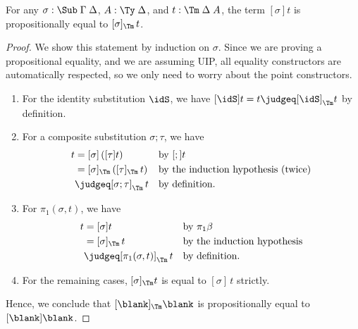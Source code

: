 \documentclass[a4paper,UKenglish,numberwithinsect,cleveref,thm-restate]{lipics-v2021}
\begin{document}
\begin{proposition}\label{prop:correctness-1}
  For any $\sigma : \Sub\;\Gamma\;\Delta$, $A : \Ty\;\Delta$, and $t : \Tm\;\Delta\;A$, the term $[\sigma]t$ is propositionally equal to $[\sigma]_{\Tm}\,t$.
\end{proposition}
\begin{proof}
  We show this statement by induction on $\sigma$. Since we are proving a propositional equality, and we are assuming UIP, all equality constructors are automatically respected, so we only need to worry about the point constructors.
  \begin{enumerate}
    \item For the identity substitution $\idS$, we have $[\idS]t = t \judgeq [\idS]_{\Tm} t$ by definition.
    \item For a composite substitution $\sigma; \tau$, we have
      \begin{align*}
        [\sigma;\tau]t & = [\sigma]\,([\tau] t)            && \text{by $[;]t$} \\
                       & = [\sigma]_{\Tm}\,([\tau]_{\Tm}\,t) && \text{by the induction hypothesis (twice)} \\ %
                       & \judgeq [\sigma;\tau]_{\Tm}\,t && \text{by definition.}
      \end{align*}
    \item For $\pi_1(\sigma, t)$, we have
      \begin{align*}
        [\pi_1(\sigma, t)]t & = [\sigma] t               && \text{by $\pi_1\beta$} \\
                            & = [\sigma]_{\Tm} \,t       && \text{by the induction hypothesis} \\ %
                            & \judgeq [\pi_1(\sigma, t)]_{\Tm}\,t && \text{by definition.}
      \end{align*}
    \item For the remaining cases, $[\sigma]_{\Tm} t$ is equal to $[\sigma]\,t$ strictly.
  \end{enumerate}
  Hence, we conclude that $[\blank]_{\Tm}\blank$ is propositionally equal to $[\blank]\blank$.
\end{proof}
\end{document}
